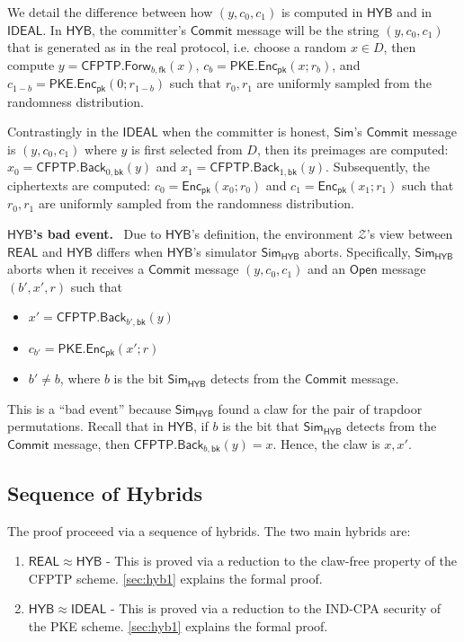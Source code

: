 \documentclass{article}[12pt]
\newcommand{\parhead}[1]{\textbf{#1}~}
\newcommand{\OpenMsg}{\mathsf{Open}}
\newcommand{\CommitMsg}{\mathsf{Commit}}
\newcommand{\PKE}{\mathsf{PKE}}
\newcommand{\Enc}{\mathsf{Enc}}
\newcommand{\EncKey}{\mathsf{pk}}
\newcommand{\CFPTP}{\mathsf{CFPTP}}
\newcommand{\Forw}{\mathsf{Forw}}
\newcommand{\Back}{\mathsf{Back}}
\newcommand{\ForwKey}{\mathsf{fk}}
\newcommand{\BackKey}{\mathsf{bk}}
\newcommand{\Domain}{D}
\newcommand{\Simulator}{{\mathsf{Sim}}} %
\newcommand{\Environment}{{\mathcal{Z}}} %
\newcommand{\Ideal}{{\mathsf{IDEAL}}}
\newcommand{\Hyb}{{\mathsf{HYB}}}
\newcommand{\Real}{{\mathsf{REAL}}}
\begin{document}
We detail the difference between how $(y, c_0, c_1)$ is computed in $\Hyb$ and in $\Ideal$. In $\Hyb$, the committer's $\CommitMsg$ message will be the string $(y, c_0, c_1)$ that is generated as in the real protocol, i.e. choose a random $x \in D$, then compute $y = \CFPTP.\Forw_{b, \ForwKey}(x)$, $c_b = \PKE.\Enc_\EncKey(x; r_b)$, and $c_{1-b} = \PKE.\Enc_\EncKey(0; r_{1-b})$ such that $r_0, r_1$ are uniformly sampled from the randomness distribution.

Contrastingly in the $\Ideal$ when the committer is honest, $\Simulator$'s $\CommitMsg$ message is $(y, c_0, c_1)$ where $y$ is first selected from $\Domain$, then its preimages are computed: $x_0 = \CFPTP.\Back_{0, \BackKey}(y)$ and $x_1 = \CFPTP.\Back_{1, \BackKey}(y)$. Subsequently, the ciphertexts are computed: $c_0 = \Enc_\EncKey(x_0; r_0)$ and $c_1 = \Enc_\EncKey(x_1; r_1)$ such that $r_0, r_1$ are uniformly sampled from the randomness distribution.

\parhead{$\Hyb$'s bad event.}
Due to $\Hyb$'s definition, the environment $\Environment$'s view between $\Real$ and $\Hyb$ differs when $\Hyb$'s simulator $\Simulator_\Hyb$ aborts. Specifically, $\Simulator_\Hyb$ aborts when it receives a $\CommitMsg$ message $(y, c_0, c_1)$ and an $\OpenMsg$ message $(b', x', r)$ such that
\begin{itemize}
	\item $x' = \CFPTP.\Back_{b', \BackKey}(y)$
	\item $c_{b'} = \PKE.\Enc_\EncKey(x'; r)$
	\item $b' \ne b$, where $b$ is the bit $\Simulator_\Hyb$ detects from the $\CommitMsg$ message.
\end{itemize}

This is a ``bad event'' because $\Simulator_\Hyb$ found a claw for the pair of trapdoor permutations. Recall that in $\Hyb$, if $b$ is the bit that $\Simulator_\Hyb$ detects from the $\CommitMsg$ message, then $\CFPTP.\Back_{b, \BackKey}(y) = x$. Hence, the claw is $x, x'$.

\subsection{Sequence of Hybrids}
The proof proceeed via a sequence of hybrids. The two main hybrids are:
\begin{enumerate}
	\item\label{hyb:1} $\Real \approx \Hyb$ - This is proved via a reduction to the claw-free property of the CFPTP scheme. \cref{sec:hyb1} explains the formal proof.
	\item\label{hyb:2} $\Hyb \approx \Ideal$ - This is proved via a reduction to the IND-CPA security of the PKE scheme. \cref{sec:hyb1} explains the formal proof.
\end{enumerate}
\end{document}
